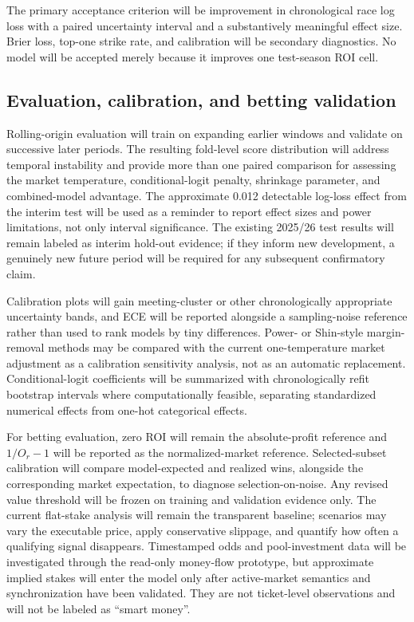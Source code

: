 The primary acceptance criterion will be improvement in chronological race log loss with a paired uncertainty interval and a substantively meaningful effect size. Brier loss, top-one strike rate, and calibration will be secondary diagnostics. No model will be accepted merely because it improves one test-season ROI cell.

\subsection{Evaluation, calibration, and betting validation}\label{sec:plan-evaluation}
Rolling-origin evaluation will train on expanding earlier windows and validate on successive later periods. The resulting fold-level score distribution will address temporal instability and provide more than one paired comparison for assessing the market temperature, conditional-logit penalty, shrinkage parameter, and combined-model advantage. The approximate 0.012 detectable log-loss effect from the interim test will be used as a reminder to report effect sizes and power limitations, not only interval significance. The existing 2025/26 test results will remain labeled as interim hold-out evidence; if they inform new development, a genuinely new future period will be required for any subsequent confirmatory claim.

Calibration plots will gain meeting-cluster or other chronologically appropriate uncertainty bands, and ECE will be reported alongside a sampling-noise reference rather than used to rank models by tiny differences. Power- or Shin-style margin-removal methods may be compared with the current one-temperature market adjustment as a calibration sensitivity analysis, not as an automatic replacement. Conditional-logit coefficients will be summarized with chronologically refit bootstrap intervals where computationally feasible, separating standardized numerical effects from one-hot categorical effects.

For betting evaluation, zero ROI will remain the absolute-profit reference and $1/O_r-1$ will be reported as the normalized-market reference. Selected-subset calibration will compare model-expected and realized wins, alongside the corresponding market expectation, to diagnose selection-on-noise. Any revised value threshold will be frozen on training and validation evidence only. The current flat-stake analysis will remain the transparent baseline; scenarios may vary the executable price, apply conservative slippage, and quantify how often a qualifying signal disappears. Timestamped odds and pool-investment data will be investigated through the read-only money-flow prototype, but approximate implied stakes will enter the model only after active-market semantics and synchronization have been validated. They are not ticket-level observations and will not be labeled as ``smart money''.

